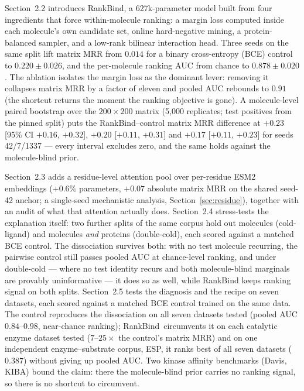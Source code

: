 \documentclass[11pt,a4paper]{article}
\newcommand{\method}{RankBind\xspace}
\newcommand{\mrr}{matrix MRR}
\begin{document}
Section~2.2 introduces \method, a 627k-parameter model built from four
ingredients that force within-molecule ranking: a margin loss computed inside
each molecule's own candidate set, online hard-negative mining, a
protein-balanced sampler, and a low-rank bilinear interaction head. Three
seeds on the same split lift \mrr{} from $0.014$ for a binary cross-entropy
(BCE) control to $0.220 \pm 0.026$, and the per-molecule ranking AUC from
chance to $0.878 \pm 0.020$. The ablation isolates the margin loss as the dominant
lever: removing it collapses \mrr{} by a factor of eleven and pooled AUC
rebounds to $0.91$ (the shortcut returns the moment the ranking objective
is gone). A molecule-level paired bootstrap over the $200\times200$ matrix
(5{,}000 replicates; test positives from the pinned split) puts the
\method--control \mrr{} difference at $+0.23$ [95\% CI $+0.16$, $+0.32$],
$+0.20$ [$+0.11$, $+0.31$] and $+0.17$ [$+0.11$, $+0.23$] for seeds
42/7/1337 --- every interval excludes zero, and the same holds against the
molecule-blind prior.

Section~2.3 adds a residue-level attention pool over per-residue ESM2
embeddings ($+0.6\%$ parameters, $+0.07$ absolute \mrr{} on the shared
seed-42 anchor; a single-seed mechanistic analysis,
Section~\ref{sec:residue}), together with an
audit of what that attention actually does.
Section~2.4 stress-tests the explanation itself: two further splits of the
same corpus hold out molecules (cold-ligand) and molecules \emph{and}
proteins (double-cold), each scored against a matched BCE control. The
dissociation survives both: with no test molecule recurring, the pairwise
control still passes pooled AUC at chance-level ranking, and under
double-cold --- where no test identity recurs and both molecule-blind
marginals are provably uninformative --- it does so as well, while
\method{} keeps ranking signal on both splits. Section~2.5 tests the diagnosis
and the recipe on seven datasets, each scored against a matched BCE control
trained on the same data. The control reproduces the dissociation on all
seven datasets tested (pooled AUC $0.84$--$0.98$, near-chance ranking);
\method\
circumvents it on each catalytic enzyme dataset tested ($7$--$25\times$ the
control's \mrr{}) and on one independent enzyme--substrate corpus, ESP, it
ranks best of all seven datasets ($0.387$) without giving up pooled AUC.
Two kinase affinity benchmarks (Davis, KIBA) bound the claim: there the
molecule-blind prior carries no ranking signal, so there is no shortcut to
circumvent.
\end{document}
